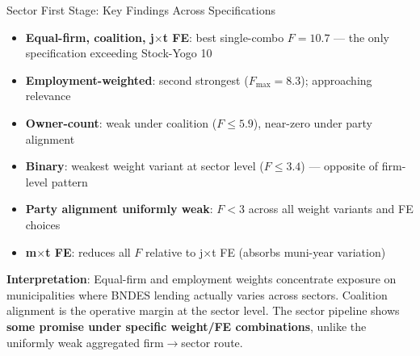 \documentclass[aspectratio=169,11pt]{beamer}
\begin{document}
\begin{frame}[shrink=5]{Sector First Stage: Key Findings Across Specifications}

\begin{itemize}\setlength{\itemsep}{4pt}
    \item \textbf{Equal-firm, coalition, j$\times$t FE}: best single-combo $F = 10.7$ --- the only specification exceeding Stock-Yogo 10
    \item \textbf{Employment-weighted}: second strongest ($F_{\max} = 8.3$); approaching relevance
    \item \textbf{Owner-count}: weak under coalition ($F \leq 5.9$), near-zero under party alignment
    \item \textbf{Binary}: weakest weight variant at sector level ($F \leq 3.4$) --- opposite of firm-level pattern
    \item \textbf{Party alignment uniformly weak}: $F < 3$ across all weight variants and FE choices
    \item \textbf{m$\times$t FE}: reduces all $F$ relative to j$\times$t FE (absorbs muni-year variation)
\end{itemize}

\bigskip

\textbf{Interpretation}: Equal-firm and employment weights concentrate exposure on municipalities where BNDES lending actually varies across sectors. Coalition alignment is the operative margin at the sector level. The sector pipeline shows \textbf{some promise under specific weight/FE combinations}, unlike the uniformly weak aggregated firm$\to$sector route.

\end{frame}
\end{document}
